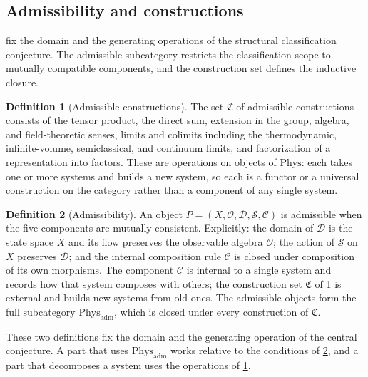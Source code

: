 \documentclass[11pt,letterpaper]{article}
\theoremstyle{definition}
\newtheorem{definition}[definition]{Definition}
\theoremstyle{remark}
\begin{document}
\subsection{Admissibility and constructions}

 fix the domain and the generating operations of the structural classification conjecture. The admissible subcategory restricts the classification scope to mutually compatible components, and the construction set defines the inductive closure.

\begin{definition}[Admissible constructions]
\label{def:constructions}
The set $\mathfrak{C}$ of admissible constructions consists of the tensor product, the direct sum, extension in the group, algebra, and field-theoretic senses, limits and colimits including the thermodynamic, infinite-volume, semiclassical, and continuum limits, and factorization of a representation into factors. These are operations on objects of $\mathrm{Phys}$: each takes one or more systems and builds a new system, so each is a functor or a universal construction on the category rather than a component of any single system.
\end{definition}

\begin{definition}[Admissibility]
\label{def:admissibility}
An object $P = (X, \mathcal{O}, \mathcal{D}, \mathcal{S}, \mathcal{C})$ is admissible when the five components are mutually consistent. Explicitly: the domain of $\mathcal{D}$ is the state space $X$ and its flow preserves the observable algebra $\mathcal{O}$; the action of $\mathcal{S}$ on $X$ preserves $\mathcal{D}$; and the internal composition rule $\mathcal{C}$ is closed under composition of its own morphisms. The component $\mathcal{C}$ is internal to a single system and records how that system composes with others; the construction set $\mathfrak{C}$ of \cref{def:constructions} is external and builds new systems from old ones. The admissible objects form the full subcategory $\mathrm{Phys}_{\mathrm{adm}}$, which is closed under every construction of $\mathfrak{C}$.
\end{definition}

These two definitions fix the domain and the generating operation of the central conjecture. A part that uses $\mathrm{Phys}_{\mathrm{adm}}$ works relative to the conditions of \cref{def:admissibility}, and a part that decomposes a system uses the operations of \cref{def:constructions}.
\end{document}
